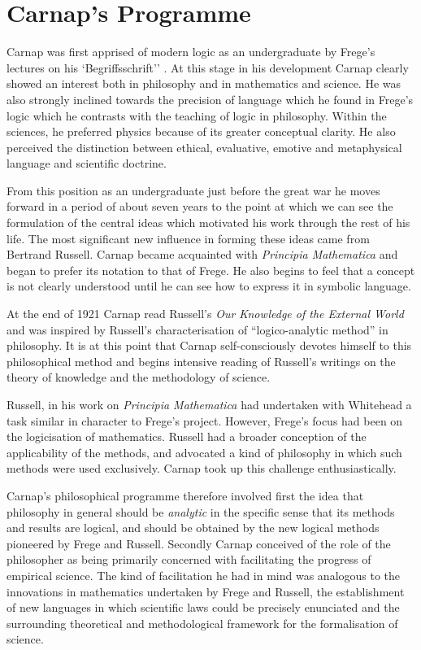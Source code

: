 \section{Carnap's Programme}

Carnap was first apprised of modern logic as an undergraduate by Frege's lectures on his `Begriffsschrift'' \cite{frege1879,heijenoort67}.
At this stage in his development Carnap clearly showed an interest both in philosophy and in mathematics and science.
He was also strongly inclined towards the precision of language which he found in Frege's logic which he contrasts with the teaching of logic in philosophy.
Within the sciences, he preferred physics because of its greater conceptual clarity.
He also perceived the distinction between ethical, evaluative, emotive and metaphysical language and scientific doctrine.

From this position as an undergraduate just before the great war he moves forward in a period of about seven years to the point at which we can see the formulation of the central ideas which motivated his work through the rest of his life.
The most significant new influence in forming these ideas came from Bertrand Russell.
Carnap became acquainted with \emph{Principia Mathematica}\cite{russell10} and began to prefer its notation to that of Frege.
He also begins to feel that a concept is not clearly understood until he can see how to express it in symbolic language.

At the end of 1921 Carnap read Russell's \emph{Our Knowledge of the External World}\cite{russell1921} and was inspired by Russell's characterisation of ``logico-analytic method'' in philosophy.
It is at this point that Carnap self-consciously devotes himself to this philosophical method and begins intensive reading of Russell's writings on the theory of knowledge and the methodology of science.

Russell, in his work on \emph{Principia Mathematica} had undertaken with Whitehead a task similar in character to Frege's project.
However, Frege's focus had been on the logicisation of mathematics.
Russell had a broader conception of the applicability of the methods, and advocated a kind of philosophy in which such methods were used exclusively.
Carnap took up this challenge enthusiastically.

Carnap's philosophical programme therefore involved first the idea that philosophy in general should be \emph{analytic} in the specific sense that its methods and results are logical, and should be obtained by the new logical methods pioneered by Frege and Russell.
Secondly Carnap conceived of the role of the philosopher as being primarily concerned with facilitating the progress of empirical science.
The kind of facilitation he had in mind was analogous to the innovations in mathematics undertaken by Frege and Russell, the establishment of new languages in which scientific laws could be precisely enunciated and the surrounding theoretical and methodological framework for the formalisation of science.

